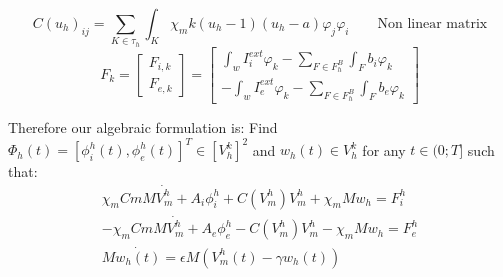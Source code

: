 \documentclass[a4paper,12pt]{article}
\begin{document}
\begin{equation}
C(u_h)_{ij} =  \sum_{K \in \tau_h} \int_K \chi_m k(u_h-1)(u_h-a)\varphi_j\varphi_i \qquad{\text{Non linear matrix}}
\end{equation}
\begin{equation}
F_k=\begin{bmatrix} F_{i,k} \\ F_{e,k} \end{bmatrix}=\begin{bmatrix} \int_{w} I_i^{ext}\varphi_k - \sum_{F \in F_h^B} \int_F b_i\varphi_k \\ - \int_{w} I_e^{ext}\varphi_k - \sum_{F \in F_h^B} \int_F b_e\varphi_k \end{bmatrix}
\end{equation}

Therefore our algebraic formulation is:\newline
Find $\Phi_h(t)=[\phi_i^h(t),\phi_e^h(t)]^T \in [V_h^k]^2$ and $w_h(t) \in V_h^k$ for any $t \in (0;T]$ such that:
\begin{equation}\label{algebraic}
\begin{gathered}
\chi_m Cm M \dot{V_m^h}+A_i \phi_i^h+C(V_m^h) V_m^h+\chi_m M w_h=F_i^h\\
-\chi_m Cm M \dot{V_m^h}+A_e \phi_e^h-C(V_m^h) V_m^h-\chi_m M w_h=F_e^h\\
M \dot{w_h(t)}=\epsilon M (V_m^h(t)-\gamma w_h(t))
\end{gathered}
\end{equation}
 
\end{document}
